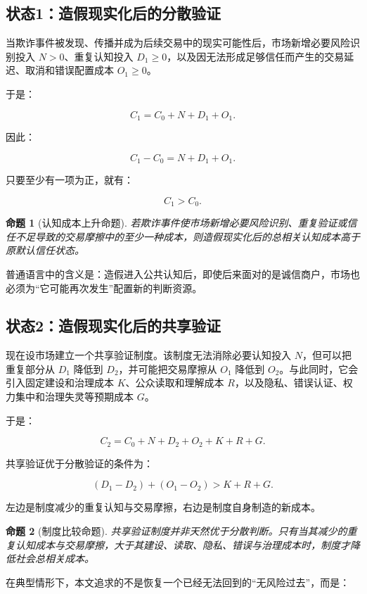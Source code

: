 \documentclass[UTF8,12pt]{ctexart}
\newtheorem{proposition}{命题}
\begin{document}
\subsection{状态1：造假现实化后的分散验证}

当欺诈事件被发现、传播并成为后续交易中的现实可能性后，市场新增必要风险识别投入 $N>0$、重复认知投入 $D_1\geq0$，以及因无法形成足够信任而产生的交易延迟、取消和错误配置成本 $O_1\geq0$。

于是：

\[
C_1=C_0+N+D_1+O_1.
\]

因此：

\[
C_1-C_0=N+D_1+O_1.
\]

只要至少有一项为正，就有：

\[
\boxed{C_1>C_0}.
\]

\begin{proposition}[认知成本上升命题]
若欺诈事件使市场新增必要风险识别、重复验证或信任不足导致的交易摩擦中的至少一种成本，则造假现实化后的总相关认知成本高于原默认信任状态。
\end{proposition}

普通语言中的含义是：造假进入公共认知后，即使后来面对的是诚信商户，市场也必须为“它可能再次发生”配置新的判断资源。

\subsection{状态2：造假现实化后的共享验证}

现在设市场建立一个共享验证制度。该制度无法消除必要认知投入 $N$，但可以把重复部分从 $D_1$ 降低到 $D_2$，并可能把交易摩擦从 $O_1$ 降低到 $O_2$。与此同时，它会引入固定建设和治理成本 $K$、公众读取和理解成本 $R$，以及隐私、错误认证、权力集中和治理失灵等预期成本 $G$。

于是：

\[
C_2=C_0+N+D_2+O_2+K+R+G.
\]

共享验证优于分散验证的条件为：

\[
\boxed{(D_1-D_2)+(O_1-O_2)>K+R+G}.
\]

左边是制度减少的重复认知与交易摩擦，右边是制度自身制造的新成本。

\begin{proposition}[制度比较命题]
共享验证制度并非天然优于分散判断。只有当其减少的重复认知成本与交易摩擦，大于其建设、读取、隐私、错误与治理成本时，制度才降低社会总相关成本。
\end{proposition}

在典型情形下，本文追求的不是恢复一个已经无法回到的“无风险过去”，而是：
\end{document}
